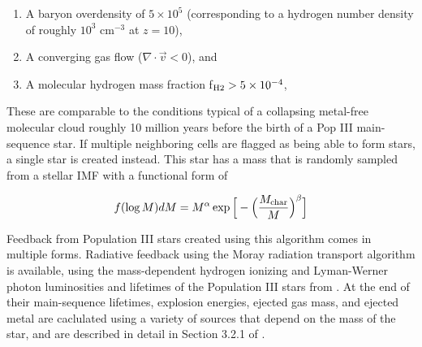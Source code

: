 \begin{enumerate}
\item A baryon overdensity of $5 \times 10^5$ (corresponding to a
  hydrogen number density of 
  roughly $10^3$ cm$^{-3}$ at $z=10$),

\item A converging gas flow ($\nabla \cdot \vec{v} < 0$), and

\item A molecular hydrogen mass fraction f$_{\rm H2} > 5 \times 10^{-4}$,
\end{enumerate}

These are comparable to the conditions typical of a collapsing metal-free molecular cloud roughly
10 million years before the birth of a Pop III main-sequence star.  If
multiple neighboring cells are flagged as being able to form stars, a
single star is created instead.  This star has a mass that is randomly
sampled from a stellar IMF with a functional form of

\begin{equation}
f(\log M) dM = M^{\alpha} \exp \Big[ -\Big( \frac{M_{\rm char}}{M}
\Big)^{\beta} \Big]
\end{equation}

Feedback from Population III stars created using this algorithm comes in multiple forms.
Radiative feedback using the Moray radiation transport algorithm
\citep{Wise11_Moray} is available, using the mass-dependent hydrogen
ionizing and Lyman-Werner photon luminosities and lifetimes of the
Population III stars from \citet{2002A&A...382...28S}.  At the end of
their main-sequence lifetimes, explosion energies, ejected gas mass,
and ejected metal are caclulated using a variety of sources that
depend on the mass of the star, and are described in detail in Section
3.2.1 of \citet{2012MNRAS.427..311W}.


